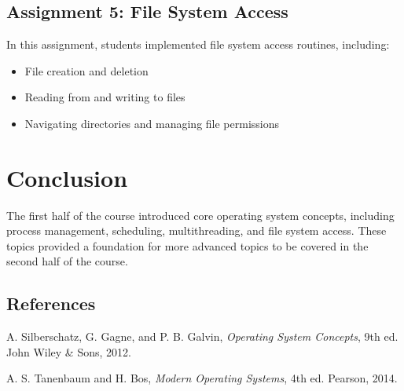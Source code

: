 \documentclass[12pt]{article}
\begin{document}
\subsection{Assignment 5: File System Access}
In this assignment, students implemented file system access routines, including:
\begin{itemize}
    \item File creation and deletion
    \item Reading from and writing to files
    \item Navigating directories and managing file permissions
\end{itemize}

\section{Conclusion}
The first half of the course introduced core operating system concepts, including process management, scheduling, multithreading, and file system access. These topics provided a foundation for more advanced topics to be covered in the second half of the course.

\subsection{References}
\begin{thebibliography}{9}

A. Silberschatz, G. Gagne, and P. B. Galvin, 
\textit{Operating System Concepts}, 9th ed. 
John Wiley \& Sons, 2012.

A. S. Tanenbaum and H. Bos, 
\textit{Modern Operating Systems}, 4th ed. 
Pearson, 2014.

\end{thebibliography}
\end{document}

